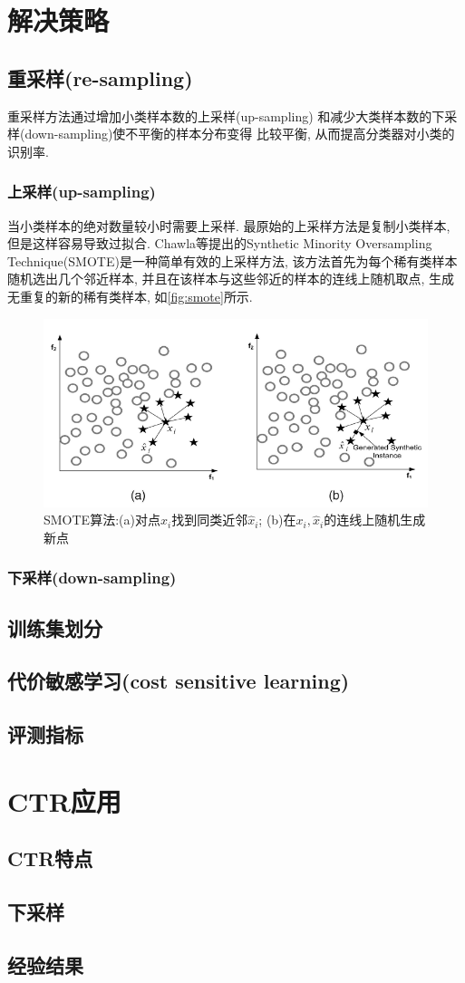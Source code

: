 \documentclass[draft,a4paper]{ctexart}
\begin{document}
\section{解决策略}
\subsection{重采样(re-sampling)}
重采样方法通过增加小类样本数的上采样(up-sampling)
和减少大类样本数的下采样(down-sampling)使不平衡的样本分布变得
比较平衡, 从而提高分类器对小类的识别率.
\subsubsection{上采样(up-sampling)}
当小类样本的绝对数量较小时需要上采样.
最原始的上采样方法是复制小类样本,
但是这样容易导致过拟合.
Chawla等\cite{chawla2002smote}提出的Synthetic Minority Oversampling
Technique(SMOTE)是一种简单有效的上采样方法,
该方法首先为每个稀有类样本随机选出几个邻近样本,
并且在该样本与这些邻近的样本的连线上随机取点,
生成无重复的新的稀有类样本, 如\autoref{fig:smote}所示.
\begin{figure}[htpb]
  \centering
  \includegraphics[width=.8\textwidth]{smote}
  \caption{SMOTE算法:(a)对点\(x_i\)找到同类近邻\(\hat{x}_i\);
  (b)在\(x_i, \hat{x}_i\)的连线上随机生成新点}
  \label{fig:smote}
\end{figure}
\subsubsection{下采样(down-sampling)}

\subsection{训练集划分}

\subsection{代价敏感学习(cost sensitive learning)}

\subsection{评测指标}

\section{CTR应用}
\subsection{CTR特点}
\subsection{下采样}
\subsection{经验结果}



\end{document}
